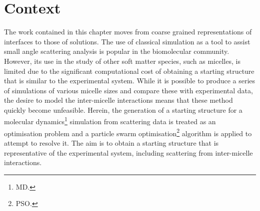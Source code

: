 \section*{Context}
The work contained in this chapter moves from coarse grained representations of interfaces to those of solutions.
The use of classical simulation as a tool to assist small angle scattering analysis is popular in the biomolecular community.\autocite{perkins_atomistic_2016,hub_interpreting_2018}
However, its use in the study of other soft matter species, such as micelles, is limited due to the significant computational cost of obtaining a starting structure that is similar to the experimental system.
While it is possible to produce a series of simulations of various micelle sizes and compare these with experimental data, the desire to model the inter-micelle interactions means that these method quickly become unfeasible.
Herein, the generation of a starting structure for a molecular dynamics\footnote{MD.} simulation from scattering data is treated as an optimisation problem and a particle swarm optimisation\footnote{PSO.} algorithm is applied to attempt to resolve it.
The aim is to obtain a starting structure that is representative of the experimental system, including scattering from inter-micelle interactions.
